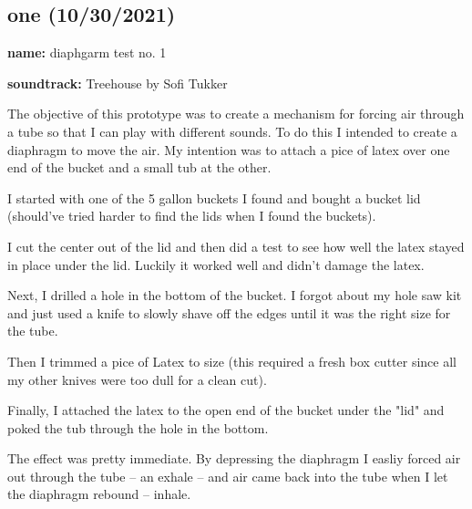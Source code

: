 \documentclass[11pt]{report}
\begin{document}
\subsection*{one (10/30/2021)}

\textbf{name:} diaphgarm test no. 1

\textbf{soundtrack:} Treehouse by Sofi Tukker

The objective of this prototype was to create a mechanism for forcing air through a tube so that I can play with different sounds. To do this I intended to create a diaphragm to move the air. My intention was to attach a pice of latex over one end of the bucket and a small tub at the other.

I started with one of the 5 gallon buckets I found and bought a bucket lid (should've tried harder to find the lids when I found the buckets).

I cut the center out of the lid and then did a test to see how well the latex stayed in place under the lid. Luckily it worked well and didn't damage the latex.

Next, I drilled a hole in the bottom of the bucket. I forgot about my hole saw kit and just used a knife to slowly shave off the edges until it was the right size for the tube.

Then I trimmed a pice of Latex to size (this required a fresh box cutter since all my other knives were too dull for a clean cut).

Finally, I attached the latex to the open end of the bucket under the "lid" and poked the tub through the hole in the bottom.

The effect was pretty immediate. By depressing the diaphragm I easliy forced air out through the tube -- an exhale -- and air came back into the tube when I let the diaphragm rebound -- inhale. 
\end{document}
